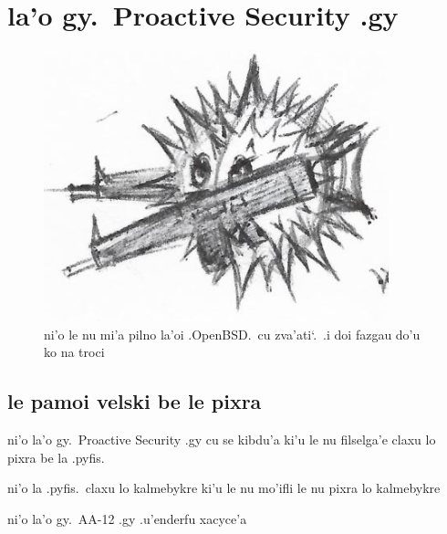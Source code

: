 \documentclass{report}
\newcommand\sds{\spacefactor\sfcode`.\ \space}
\begin{document}
\chapter{la'o gy.\ Proactive Security .gy}
\begin{figure}[ht]
	\centering
	\includegraphics[width=10cm]{proactivesecurity/proactivesecurity.png}
	\caption[center]{ni'o le nu mi'a pilno la'oi .OpenBSD.\ cu zva'ati\sds  .i doi fazgau do'u ko na troci}
\end{figure}
\section{le pamoi velski be le pixra}
ni'o la'o gy.\ Proactive Security .gy cu se kibdu'a ki'u le nu filselga'e claxu lo pixra be la .pyfis.

ni'o la .pyfis.\ claxu lo kalmebykre ki'u le nu mo'ifli le nu pixra lo kalmebykre

ni'o la'o gy.\ AA-12 .gy .u'enderfu xacyce'a
\end{document}
